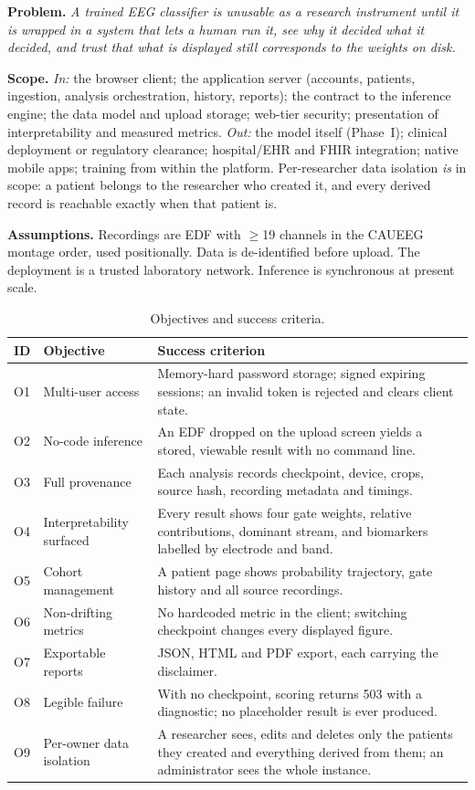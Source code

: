 \documentclass[11pt,a4paper]{article}
\begin{document}
\textbf{Problem.} \emph{A trained EEG classifier is unusable as a research
instrument until it is wrapped in a system that lets a human run it, see why it
decided what it decided, and trust that what is displayed still corresponds to
the weights on disk.}

\textbf{Scope.} \emph{In:} the browser client; the application server
(accounts, patients, ingestion, analysis orchestration, history, reports); the
contract to the inference engine; the data model and upload storage; web-tier
security; presentation of interpretability and measured metrics.
\emph{Out:} the model itself (Phase~I); clinical deployment or regulatory
clearance; hospital/EHR and FHIR integration; native mobile apps; training
from within the platform. Per-researcher data isolation \emph{is} in scope: a
patient belongs to the researcher who created it, and every derived record is
reachable exactly when that patient is.

\textbf{Assumptions.} Recordings are EDF with $\geq$19 channels in the CAUEEG
montage order, used positionally. Data is de-identified before upload. The
deployment is a trusted laboratory network. Inference is synchronous at present
scale.

\begin{table}[H]\centering\caption{Objectives and success criteria.}
\label{tab:obj}\footnotesize
\begin{tabularx}{\linewidth}{@{}C{0.7cm} L{3.4cm} Y@{}}
\toprule
\textbf{ID} & \textbf{Objective} & \textbf{Success criterion} \\
\midrule
O1 & Multi-user access & Memory-hard password storage; signed expiring sessions; an invalid token is rejected and clears client state. \\
O2 & No-code inference & An EDF dropped on the upload screen yields a stored, viewable result with no command line. \\
O3 & Full provenance & Each analysis records checkpoint, device, crops, source hash, recording metadata and timings. \\
O4 & Interpretability surfaced & Every result shows four gate weights, relative contributions, dominant stream, and biomarkers labelled by electrode and band. \\
O5 & Cohort management & A patient page shows probability trajectory, gate history and all source recordings. \\
O6 & Non-drifting metrics & No hardcoded metric in the client; switching checkpoint changes every displayed figure. \\
O7 & Exportable reports & JSON, HTML and PDF export, each carrying the disclaimer. \\
O8 & Legible failure & With no checkpoint, scoring returns 503 with a diagnostic; no placeholder result is ever produced. \\
O9 & Per-owner data isolation & A researcher sees, edits and deletes only the patients they created and everything derived from them; an administrator sees the whole instance. \\
\bottomrule
\end{tabularx}
\end{table}
\end{document}
